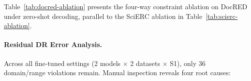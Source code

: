 Table~\ref{tab:docred-ablation} presents the four-way constraint ablation on DocRED under zero-shot decoding, parallel to the SciERC ablation in Table~\ref{tab:scierc-ablation}.

\begin{table}[t]
\centering
\small
\setlength{\tabcolsep}{3.6pt}
%
\caption{Four-way ablation on DocRED (998 documents, Qwen3-8B, zero-shot).
$\Delta$DR: relative change vs.\ unconstrained.
Tot.\ = DR + CF (total type-violation burden).
Best per column in \textbf{bold} (CF excluded; Tot.\ included).
F1 $\times$100. Bootstrap significance: R-F1 $+$0.49\,pp ($p < 0.001$).
Grammar-only $\uparrow$DR: vocabulary enforcement makes OOV outputs evaluable, exposing latent violations (see \S\ref{sec:docred-results}).}
\label{tab:docred-ablation}
\end{table}


\paragraph{Residual DR Error Analysis.}
\label{app:residual-dr-analysis}

Across all fine-tuned settings (2 models $\times$ 2 datasets $\times$ S1), only 36 domain/range violations remain.
Manual inspection reveals four root causes:

